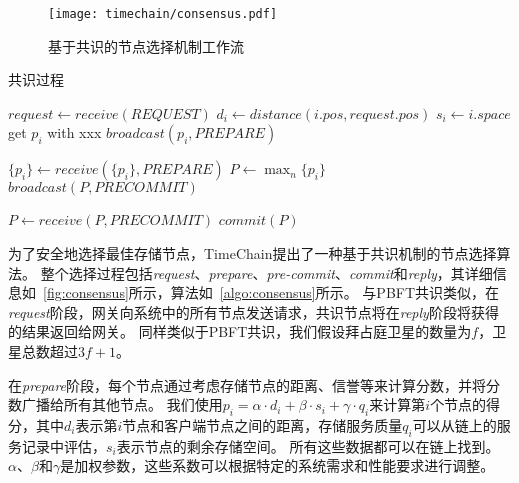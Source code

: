 \begin{figure}[t]
    \centering
    \texttt{[image: timechain/consensus.pdf]}
    \caption{基于共识的节点选择机制工作流}
    \label{fig:consensus}
\end{figure}

\begin{algorithm}
	\caption{共识过程}
	\label{algo:consensus}
	\begin{algorithmic}[1]
        \renewcommand{\algorithmicrequire}{ \textbf{Prepare}}
        \REQUIRE
            \STATE $request \gets \textit{receive}(REQUEST)$
                \STATE $d_i \gets \textit{distance}(i.pos, request.pos)$
                \STATE $s_i \gets i.space$
                \STATE get $p_i$ with xxx
                \STATE $\textit{broadcast}(p_i, \textit{PREPARE})$
            \ENDIF

        \renewcommand{\algorithmicrequire}{ \textbf{PreCommit}}
        \REQUIRE
            \STATE $\{p_i\} \gets \textit{receive}(\{p_i\}, \textit{PREPARE})$
                \STATE $P \gets \max_n \{p_i\}$
                \STATE $\textit{broadcast}(P, \textit{PRECOMMIT})$
            \ENDIF

        \renewcommand{\algorithmicrequire}{ \textbf{Commit}}
        \REQUIRE
            \STATE $P \gets \textit{receive}(P, \textit{PRECOMMIT})$
                \STATE $\textit{commit}(P)$
            \ENDIF
	\end{algorithmic}
\end{algorithm}

为了安全地选择最佳存储节点，TimeChain提出了一种基于共识机制的节点选择算法。
整个选择过程包括\textit{request}、\textit{prepare}、\textit{pre-commit}、\textit{commit}和\textit{reply}，其详细信息如~\autoref{fig:consensus}所示，算法如~\autoref{algo:consensus}所示。
与PBFT共识类似，在\textit{request}阶段，网关向系统中的所有节点发送请求，共识节点将在\textit{reply}阶段将获得的结果返回给网关。
同样类似于PBFT共识，我们假设拜占庭卫星的数量为$f$，卫星总数超过$3f+1$。

在\textit{prepare}阶段，每个节点通过考虑存储节点的距离、信誉等来计算分数，并将分数广播给所有其他节点。
我们使用$p_i=\alpha\cdot d_i+\beta\cdot s_i+\gamma\cdot q_i$来计算第$i$个节点的得分，其中$d_i$表示第$i$节点和客户端节点之间的距离，存储服务质量$q_i$可以从链上的服务记录中评估，$s_i$表示节点的剩余存储空间。
所有这些数据都可以在链上找到。
$\alpha$、$\beta$和$\gamma$是加权参数，这些系数可以根据特定的系统需求和性能要求进行调整。


